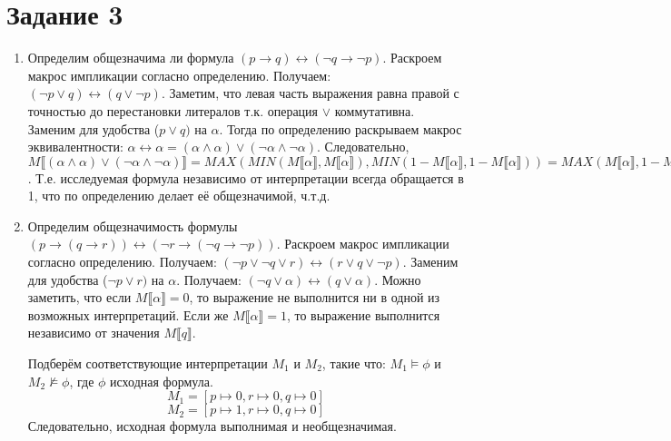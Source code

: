 \documentclass{article}
\begin{document}
\section*{Задание 3}
\begin{enumerate}
    \item
        Определим общезначима ли формула \(
            (p \rightarrow q) 
            \leftrightarrow (\neg q \rightarrow \neg p)
        \).
        Раскроем макрос импликации согласно определению. Получаем: \(
            (\neg p \lor q) 
            \leftrightarrow (q \lor \neg p)
        \). Заметим, что левая часть выражения равна правой с 
        точностью до перестановки литералов т.к. операция \(\lor\) коммутативна. 
        Заменим для удобства (\(p \lor q)\) на \(\alpha\).
        Тогда по определению раскрываем макрос эквивалентности: \(
            \alpha \leftrightarrow \alpha 
            = (\alpha \land \alpha) \lor (\neg \alpha \land \neg \alpha)
        \). Следовательно, \(
            M\llbracket (\alpha \land \alpha) \lor (\neg \alpha \land \neg \alpha) \rrbracket
            = MAX(MIN(M\llbracket \alpha \rrbracket, M\llbracket \alpha \rrbracket), MIN(1 - M\llbracket \alpha \rrbracket, 1 - M\llbracket \alpha \rrbracket))
            = MAX(M\llbracket \alpha \rrbracket, 1 - M\llbracket \alpha \rrbracket) = 1 
        \). Т.е. исследуемая формула независимо от интерпретации всегда обращается в 1, 
        что по определению делает её общезначимой, ч.т.д.
    \item
        Определим общезначимость формулы \(
            (p \rightarrow (q \rightarrow r)) 
            \leftrightarrow (\neg r \rightarrow (\neg q \rightarrow \neg p))
        \). Раскроем макрос импликации согласно определению. Получаем: \(
            (\neg p \lor \neg q \lor r) \leftrightarrow (r \lor q \lor \neg p)
        \). Заменим для удобства (\(\neg p \lor r)\) на \(\alpha\).
        Получаем: \((\neg q \lor \alpha) \leftrightarrow (q \lor \alpha)\).
        Можно заметить, что если \(M \llbracket \alpha \rrbracket = 0\), 
        то выражение не выполнится ни в одной из возможных интерпретаций. Если же 
        \(M \llbracket \alpha \rrbracket = 1\), то выражение выполнится независимо 
        от значения \(M \llbracket q \rrbracket\).
        
        Подберём соответствующие интерпретации \(M_1\) и \(M_2\), такие что: 
        \(M_1 \models \phi\) и \(M_2 \nvDash \phi\), где \(\phi\) исходная формула.
        \[M_1 = [p \mapsto 0, r \mapsto 0, q \mapsto 0]\]
        \[M_2 = [p \mapsto 1, r \mapsto 0, q \mapsto 0]\]
        Следовательно, исходная формула выполнимая и необщезначимая.
\end{enumerate}
\end{document}
